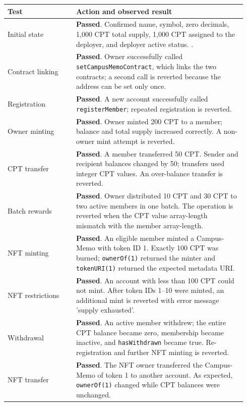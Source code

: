 \documentclass[9pt,a4paper]{article}
\newcommand{\code}[1]{\texttt{\small #1}}
\begin{document}
\begin{tabular}{>{\raggedright\arraybackslash}p{0.27\linewidth} p{0.67\linewidth}}
\textbf{Test} & \textbf{Action and observed result} \\\hline
Initial state & \textbf{Passed}. Confirmed name, symbol, zero decimals, 1,000 CPT total supply, 1,000 CPT assigned to the deployer, and deployer active status. . \\
Contract linking & \textbf{Passed}. Owner successfully called \code{setCampusMemoContract}, which links the two contracts; a second call is reverted because the address can be set only once. \\
Registration & \textbf{Passed}. A new account successfully called \code{registerMember}; repeated registration is reverted.  \\
Owner minting & \textbf{Passed}. Owner minted 200 CPT to a member; balance and total supply increased correctly. A non-owner mint attempt is reverted. \\
CPT transfer & \textbf{Passed}. A member transferred 50 CPT. Sender and recipient balances changed by 50; transfers used integer CPT values. An over-balance transfer is reverted.  \\
Batch rewards & \textbf{Passed}. Owner distributed 10 CPT and 30 CPT to two active members in one batch. The operation is reverted when the CPT value array-length mismatch with the member array-length.  \\
NFT minting & \textbf{Passed}. An eligible member minted a Campus-Memo with token ID 1. Exactly 100 CPT was burned; \code{ownerOf(1)} returned the minter and \code{tokenURI(1)} returned the expected metadata URI.  \\
NFT restrictions & \textbf{Passed}. An account with less than 100 CPT could not mint. After token IDs 1--10 were minted, an additional mint is reverted with error message 'supply exhausted'. \\
Withdrawal & \textbf{Passed}. An active member withdrew; the entire CPT balance became zero, membership became inactive, and \code{hasWithdrawn} became true. Re-registration and further NFT minting is reverted.  \\
NFT transfer & \textbf{Passed}. The NFT owner transferred the Campus-Memo of token 1 to another account. As expected, \code{ownerOf(1)} changed while CPT balances were unchanged.  \\
\end{tabular}
\end{document}
